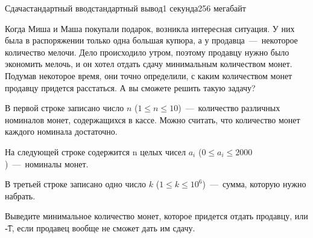 \begin{problem}{Сдача}{стандартный ввод}{стандартный вывод}{1 секунда}{256 мегабайт}

Когда Миша и Маша покупали подарок, возникла интересная ситуация. У них была в
распоряжении только одна большая купюра, а у продавца~---~некоторое количество мелочи. Дело
происходило утром, поэтому продавцу нужно было экономить мелочь, и он хотел отдать сдачу
минимальным количеством монет. Подумав некоторое время, они точно определили, с каким
количеством монет продавцу придется расстаться. А вы сможете решить такую задачу?


\InputFile
В первой строке записано число $n$ ($1 \le n \le 10$)~---~количество различных
номиналов монет, содержащихся в кассе. Можно считать, что количество монет каждого номинала
достаточно.

На следующей строке содержится n целых чисел $a_i$ ($0 \le a_i \le 2000$)~---~номиналы монет.

В третьей строке записано одно число $k$ ($1 \le k \le 10^6$)~---~сумма, которую нужно набрать.


\OutputFile
Выведите минимальное количество монет, которое придется отдать продавцу,
или \t{-1}, если продавец вообще не сможет дать им сдачу.

\Examples

\begin{example}
%
%
\end{example}

\end{problem}


